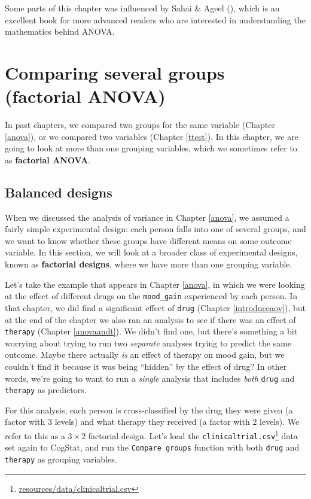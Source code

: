 \documentclass[
  11pt,
  a4paper,
  twoside,symmetric,openright]{book}
\theoremstyle{break}
\theoremstyle{break}
\DeclareRobustCommand{\href}[2]{#2\footnote{\url{#1}}}
\begin{document}
Some parts of this chapter was influenced by Sahai \& Ageel (), which is an excellent book for more advanced readers who are interested in understanding the mathematics behind ANOVA.

\chapter{Comparing several groups (factorial ANOVA)}\label{anova2}

In past chapters, we compared two groups for the same variable (Chapter \ref{anova}), or we compared two variables (Chapter \ref{ttest}). In this chapter, we are going to look at more than one grouping variables, which we sometimes refer to as \textbf{factorial ANOVA}.

\section{Balanced designs}\label{factorialanovasimple}

When we discussed the analysis of variance in Chapter \ref{anova}, we assumed a fairly simple experimental design: each person falls into one of several groups, and we want to know whether these groups have different means on some outcome variable. In this section, we will look at a broader class of experimental designs, known as \textbf{factorial designs}, where we have more than one grouping variable.

Let's take the example that appears in Chapter \ref{anova}, in which we were looking at the effect of different drugs on the \texttt{mood\_gain} experienced by each person. In that chapter, we did find a significant effect of \texttt{drug} (Chapter \ref{introduceaov}), but at the end of the chapter we also ran an analysis to see if there was an effect of \texttt{therapy} (Chapter \ref{anovaandt}). We didn't find one, but there's something a bit worrying about trying to run two \emph{separate} analyses trying to predict the same outcome. Maybe there actually \emph{is} an effect of therapy on mood gain, but we couldn't find it because it was being ``hidden'' by the effect of drug? In other words, we're going to want to run a \emph{single} analysis that includes \emph{both} \texttt{drug} and \texttt{therapy} as predictors.

For this analysis, each person is cross-classified by the drug they were given (a factor with 3 levels) and what therapy they received (a factor with 2 levels). We refer to this as a \(3 \times 2\) factorial design. Let's load the \href{resources/data/clinicaltrial.csv}{\texttt{clinicaltrial.csv}} data set again to CogStat, and run the \texttt{Compare\ groups} function with both \texttt{drug} and \texttt{therapy} as grouping variables.
\end{document}
